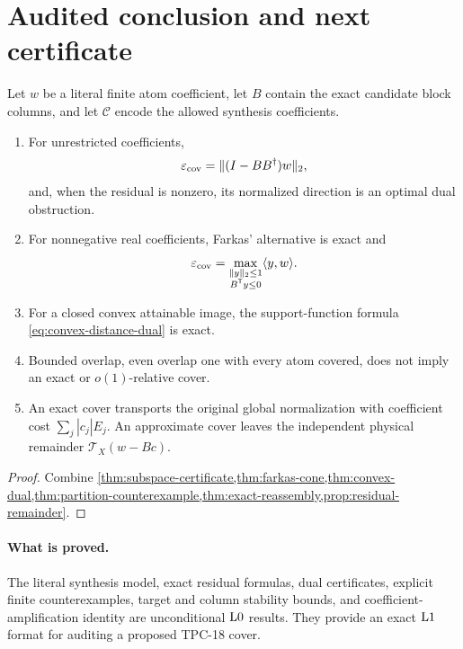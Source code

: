 \section{Audited conclusion and next certificate}
\label{sec:claim-boundary}

\begin{theorem}
\label{thm:audited-conclusion}
Let \(w\) be a literal finite atom coefficient, let \(B\) contain the
exact candidate block columns, and let \(\mathscr C\) encode the
allowed synthesis coefficients.
\begin{enumerate}[label=(\roman*),leftmargin=2.2em]
\item For unrestricted coefficients,
  \[
  \varepsilon_{\mathrm{cov}}
  =
  \|(I-BB^\dagger)w\|_2,
  \]
  and, when the residual is nonzero, its normalized direction is an
  optimal dual obstruction.
\item For nonnegative real coefficients, Farkas' alternative is exact
  and
  \[
  \varepsilon_{\mathrm{cov}}
  =
  \max_{\substack{\|y\|_2\le1\\B^{\mathsf T}y\le0}}
  \langle y,w\rangle.
  \]
\item For a closed convex attainable image, the support-function
  formula \eqref{eq:convex-distance-dual} is exact.
\item Bounded overlap, even overlap one with every atom covered, does
  not imply an exact or \(o(1)\)-relative cover.
\item An exact cover transports the original global normalization
  with coefficient cost
  \(\sum_j|c_j|E_j\).  An approximate cover leaves the independent
  physical remainder \(\mathcal T_X(w-Bc)\).
\end{enumerate}
\end{theorem}

\begin{proof}
Combine
\cref{thm:subspace-certificate,thm:farkas-cone,thm:convex-dual,thm:partition-counterexample,thm:exact-reassembly,prop:residual-remainder}.
\end{proof}

\paragraph{What is proved.}
The literal synthesis model, exact residual formulas, dual
certificates, explicit finite counterexamples, target and column
stability bounds, and coefficient-amplification identity are
unconditional \(\mathrm{L0}\) results.  They provide an exact
\(\mathrm{L1}\) format for auditing a proposed TPC-18 cover.

